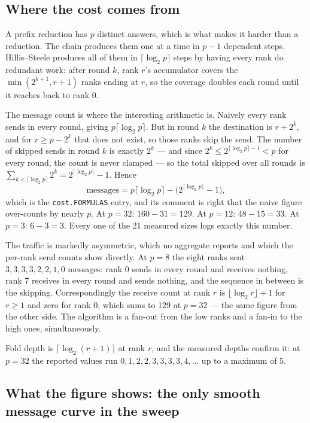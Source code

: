 \documentclass[11pt]{article}
\begin{document}
\subsection{Where the cost comes from}

A prefix reduction has $p$ distinct answers, which is what makes it harder than a reduction. The
chain produces them one at a time in $p-1$ dependent steps. Hillis--Steele produces all of them in
$\lceil\log_2 p\rceil$ steps by having every rank do redundant work: after round $k$, rank $r$'s
accumulator covers the $\min(2^{k+1}, r+1)$ ranks ending at $r$, so the coverage doubles each round
until it reaches back to rank 0.

The message count is where the interesting arithmetic is. Naively every rank sends in every round,
giving $p\lceil\log_2 p\rceil$. But in round $k$ the destination is $r + 2^k$, and for
$r \ge p - 2^k$ that does not exist, so those ranks skip the send. The number of skipped sends in
round $k$ is exactly $2^k$ --- and since $2^k \le 2^{\lceil\log_2 p\rceil - 1} < p$ for every round,
the count is never clamped --- so the total skipped over all rounds is
$\sum_{k<\lceil\log_2 p\rceil} 2^k = 2^{\lceil\log_2 p\rceil} - 1$. Hence
\[
  \text{messages} = p\lceil\log_2 p\rceil - \bigl(2^{\lceil\log_2 p\rceil} - 1\bigr),
\]
which is the \texttt{cost.FORMULAS} entry, and its comment is right that the naive figure
over-counts by nearly $p$. At $p=32$: $160 - 31 = 129$. At $p=12$: $48 - 15 = 33$. At $p=3$:
$6 - 3 = 3$. Every one of the 21 measured sizes logs exactly this number.

The traffic is markedly asymmetric, which no aggregate reports and which the per-rank send counts
show directly. At $p=8$ the eight ranks sent $3, 3, 3, 3, 2, 2, 1, 0$ messages: rank 0 sends in
every round and receives nothing, rank 7 receives in every round and sends nothing, and the
sequence in between is the skipping. Correspondingly the receive count at rank $r$ is
$\lfloor\log_2 r\rfloor + 1$ for $r \ge 1$ and zero for rank 0, which sums to 129 at $p=32$ --- the
same figure from the other side. The algorithm is a fan-out from the low ranks and a fan-in to the
high ones, simultaneously.

Fold depth is $\lceil\log_2(r+1)\rceil$ at rank $r$, and the measured depths confirm it: at $p=32$
the reported values run $0, 1, 2, 2, 3, 3, 3, 3, 4, \ldots$ up to a maximum of 5.

\subsection{What the figure shows: the only smooth message curve in the sweep}
\end{document}
